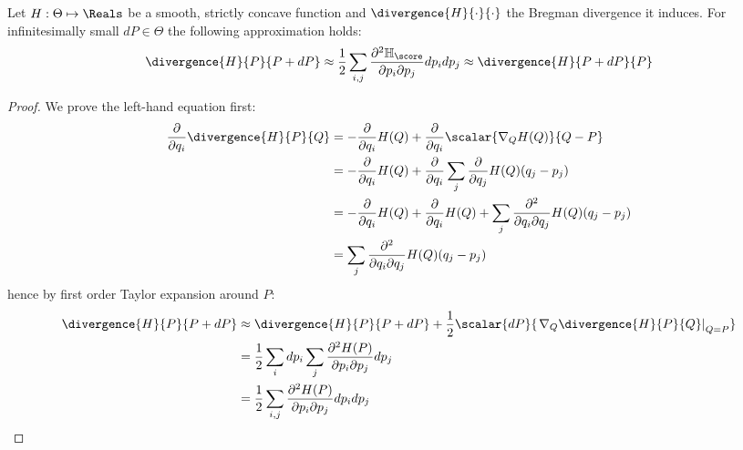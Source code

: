 \begin{statement} Let $H:\Theta\mapsto\Reals$ be a smooth, strictly concave function and $\divergence{H}{\cdot}{\cdot}$ the Bregman divergence it induces. For infinitesimally small $dP\in\Theta$ the following approximation holds:
\begin{equation}
	\divergence{H}{P}{P+ dP} \approx \frac{1}{2} \sum_{i,j} \frac{\partial^2 \mathbb{H}_{\score}}{\partial p_i\partial p_j} dp_{i} dp_{j} \approx 	\divergence{H}{P + dP}{P}
\end{equation}
\begin{proof}
	We prove the left-hand equation first:
	\begin{align}
		\frac{\partial}{\partial q_i} \divergence{H}{P}{Q} &=  -\frac{\partial}{\partial q_i} H(Q) + 	\frac{\partial}{\partial q_i}\scalar{\nabla_{Q} H(Q)}{Q-P}\\
			&=  - \frac{\partial}{\partial q_i} H(Q) + 	\frac{\partial}{\partial q_i}\sum_{j} \frac{\partial}{\partial q_j} H(Q) (q_j - p_j)\\
			&= - \frac{\partial}{\partial q_i} H(Q)  + \frac{\partial}{\partial q_i} H(Q) + \sum_{j} \frac{\partial^2}{\partial q_i \partial q_j} H(Q) (q_j - p_j)\\
			&= \sum_{j} \frac{\partial^2}{\partial q_i \partial q_j} H(Q) (q_j - p_j)
	\end{align}
	hence by first order Taylor expansion around $P$:
	\begin{align}
		\divergence{H}{P}{P+dP} &\approx  \divergence{H}{P}{P+dP}+ \frac{1}{2}\scalar{dP}{\left.\nabla_{Q}\divergence{H}{P}{Q}\right\rvert_{Q=P}}\\
			&= \frac{1}{2} \sum_{i} dp_i \sum_{j} \frac{\partial^2 H(P)}{\partial p_i\partial p_j} dp_j \\
			&= \frac{1}{2} \sum_{i,j} \frac{\partial^2 H(P)}{\partial p_i\partial p_j} dp_{i} dp_j
	\end{align}
	

\end{proof}
\end{statement}
